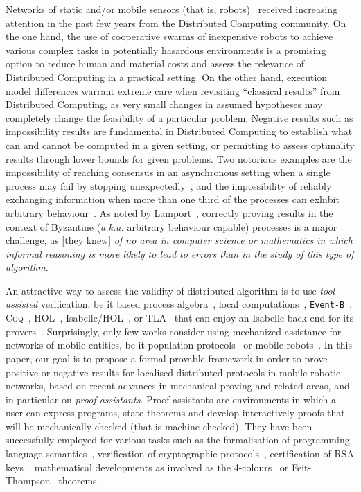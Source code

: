 \documentclass[11pt,a4]{llncs}
\newcommand{\x}{\xspace}
\newcommand{\coq}{\textsc{Coq}\x}
\begin{document}
Networks of static and/or mobile sensors (that is, robots)~\cite{FPS12b} received
increasing attention in the past few years from the Distributed
Computing community. On the one hand, the use of cooperative swarms of
inexpensive robots to achieve various complex tasks in potentially
hasardous environments is a promising option to reduce
human and material costs and assess the relevance of Distributed
Computing in a practical setting. On the other hand, execution model
differences warrant extreme care when revisiting ``classical results''
from Distributed Computing, as very small changes in assumed
hypotheses may completely change the feasibility of a particular problem.
Negative results such as impossibility results are fundamental in
Distributed Computing to establish what can and cannot be computed in
a given setting, or permitting to assess optimality results through
lower bounds for given problems. Two notorious examples are the
impossibility of reaching consensus in an asynchronous setting when a
single process may fail by stopping unexpectedly~\cite{FLP85j}, and the
impossibility of reliably exchanging information when more than one
third of the processes can exhibit arbitrary
behaviour~\cite{PSL80j}. As noted by Lamport~\cite{lamport82jacm}, correctly proving
results in the context of Byzantine (\emph{a.k.a.} arbitrary behaviour
capable) processes is a major challenge, as [they knew] \emph{of no
area in computer science or mathematics in which informal reasoning is more
likely to lead to errors than in the study of this type of
algorithm}.

An attractive way to assess the validity of distributed
algorithm is to use \emph{tool assisted} verification, be it based
process algebra~\cite{bezem97fac,fokkink07}, local
computations~\cite{litovsky99hb}, \texttt{Event-B}~\cite{cansell07},
\coq~\cite{casteran09scss}, HOL~\cite{chou95cj}, Isabelle/HOL~\cite{kuefner12ifiptcs},
or TLA~\cite{lamport82jacm,DBLP:conf/wdag/Lamport11a} that can enjoy
an Isabelle back-end for its
provers~\cite{cousineau12fm}. Surprisingly, only few works consider
using mechanized assistance for networks of mobile entities, be it
population protocols~\cite{deng09tase,clement11icdcs} or mobile robots~\cite{devismes12sss,bonnet12sss}. 
In this paper, our goal is to propose a formal provable
framework in order to prove positive or negative results for
localised distributed protocols in mobile robotic networks,
based on recent advances in mechanical proving and related areas, and
in particular on \emph{proof assistants}. Proof assistants are
environments in which a user can express programs, state theorems and
develop interactively proofs that will be mechanically checked (that
is machine-checked). They have been successfully employed for various
tasks such as the formalisation of programming language
semantics~\cite{Leroy-backend,Mccarthy67correctnessof}, verification
of cryptographic protocols~\cite{DBLP:conf/ccs/AlmeidaBBBKB12},
certification of RSA keys~\cite{thery07tphols}, mathematical
developments as involved as the 4-colours~\cite{Gonthier4color}
or Feit-Thompson~\cite{DBLP:conf/popl/Gonthier13} theorems. 
\end{document}
